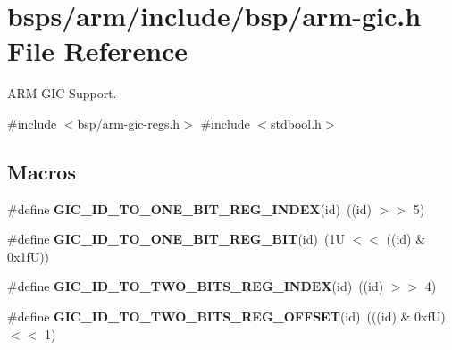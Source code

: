 \hypertarget{arm-gic_8h}{}\section{bsps/arm/include/bsp/arm-\/gic.h File Reference}
\label{arm-gic_8h}


A\+RM G\+IC Support.  


{\ttfamily \#include $<$bsp/arm-\/gic-\/regs.\+h$>$}\newline
{\ttfamily \#include $<$stdbool.\+h$>$}\newline
\subsection*{Macros}
\begin{DoxyCompactItemize}
\item 
\mbox{\label{arm-gic_8h_a83558b5a8ceb7c92fbb8301f3351c690}} 
\#define {\bfseries G\+I\+C\+\_\+\+I\+D\+\_\+\+T\+O\+\_\+\+O\+N\+E\+\_\+\+B\+I\+T\+\_\+\+R\+E\+G\+\_\+\+I\+N\+D\+EX}(id)~((id) $>$$>$ 5)
\item 
\mbox{\label{arm-gic_8h_ab0bc41f1d0ea46c00e6742ec5fc2ab48}} 
\#define {\bfseries G\+I\+C\+\_\+\+I\+D\+\_\+\+T\+O\+\_\+\+O\+N\+E\+\_\+\+B\+I\+T\+\_\+\+R\+E\+G\+\_\+\+B\+IT}(id)~(1\+U $<$$<$ ((id) \& 0x1f\+U))
\item 
\mbox{\label{arm-gic_8h_adedf056da1e9b3af3f429eed558d23ab}} 
\#define {\bfseries G\+I\+C\+\_\+\+I\+D\+\_\+\+T\+O\+\_\+\+T\+W\+O\+\_\+\+B\+I\+T\+S\+\_\+\+R\+E\+G\+\_\+\+I\+N\+D\+EX}(id)~((id) $>$$>$ 4)
\item 
\mbox{\label{arm-gic_8h_a56c15bf7aeafa0a9c9d432f895d0c438}} 
\#define {\bfseries G\+I\+C\+\_\+\+I\+D\+\_\+\+T\+O\+\_\+\+T\+W\+O\+\_\+\+B\+I\+T\+S\+\_\+\+R\+E\+G\+\_\+\+O\+F\+F\+S\+ET}(id)~(((id) \& 0xf\+U) $<$$<$ 1)
\end{DoxyCompactItemize}

